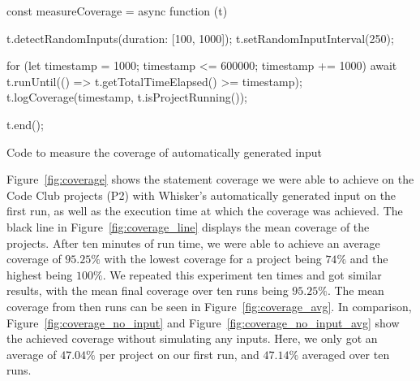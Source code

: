 
\begin{listing}[ht]
    \centering

    \begin{minipage}{.9\textwidth}
        \begin{javascriptcode}
            const measureCoverage = async function (t) {
                t.detectRandomInputs({duration: [100, 1000]});
                t.setRandomInputInterval(250);

                for (let timestamp = 1000; timestamp <= 600000; timestamp += 1000) {
                    await t.runUntil(() => t.getTotalTimeElapsed() >= timestamp);
                    t.logCoverage(timestamp, t.isProjectRunning());
                }

                t.end();
            }
        \end{javascriptcode}
    \end{minipage}

    \caption{Code to measure the coverage of automatically generated input}
    \label{lst:coverage_test}
\end{listing}

\noindent Figure~\ref{fig:coverage} shows the statement coverage we were able to achieve on the Code Club projects (P2)
with Whisker's automatically generated input on the first run,
as well as the execution time at which the coverage was achieved.
The black line in Figure~\ref{fig:coverage_line} displays the mean coverage of the projects.
After ten minutes of run time, we were able to achieve an average coverage of $95.25\%$ with the lowest coverage for a project being $74\%$ and the highest being $100\%$.
We repeated this experiment ten times and got similar results, with the mean final coverage over ten runs being $95.25\%$.
The mean coverage from then runs can be seen in Figure~\ref{fig:coverage_avg}.
In comparison, Figure~\ref{fig:coverage_no_input} and Figure~\ref{fig:coverage_no_input_avg} show the achieved coverage without simulating any inputs.
Here, we only got an average of $47.04\%$ per project on our first run, and $47.14\%$ averaged over ten runs.
\parspace

